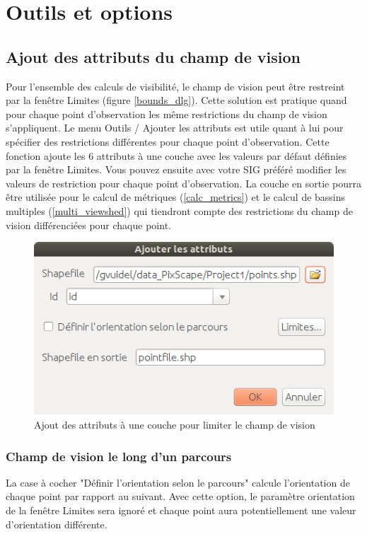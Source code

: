 \documentclass{report}
\begin{document}
\section{Outils et options}
\label{tools}

\subsection{Ajout des attributs du champ de vision}
\label{add_attributes}
Pour l'ensemble des calculs de visibilité, le champ de vision peut être restreint par la fenêtre Limites (figure \ref{bounds_dlg}). Cette solution est pratique quand pour chaque point d'observation les même restrictions du champ de vision s'appliquent. 
Le menu Outils / Ajouter les attributs est utile quant à lui pour spécifier des restrictions différentes pour chaque point d'observation. Cette fonction ajoute les 6 attributs à une couche avec les valeurs par défaut définies par la fenêtre Limites. Vous pouvez ensuite avec votre SIG préféré modifier les valeurs de restriction pour chaque point d'observation. 
La couche en sortie pourra être utilisée pour le calcul de métriques (\ref{calc_metrics}) et le calcul de bassins multiples (\ref{multi_viewshed}) qui tiendront compte des restrictions du champ de vision différenciées pour chaque point.

\begin{figure}[H]
	\includegraphics[scale=0.5]{img/add_attributes-fr.png} 
	\caption{Ajout des attributs à une couche pour limiter le champ de vision}
	\label{add_attributes_dlg}
\end{figure}

\subsubsection{Champ de vision le long d'un parcours}
La case à cocher "Définir l'orientation selon le parcours" calcule l'orientation de chaque point par rapport au suivant. Avec cette option, le paramètre orientation de la fenêtre Limites sera ignoré et chaque point aura potentiellement une valeur d'orientation différente. 
\end{document}
